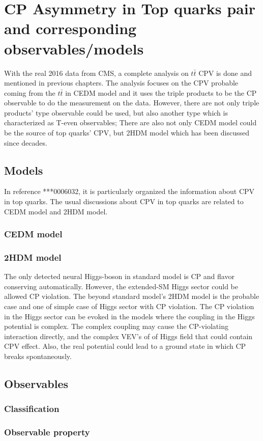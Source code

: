 

\section{CP Asymmetry in Top quarks pair and corresponding observables/models}
\label{sec:AcpModelObs}

	With the real 2016 data from CMS, a complete analysis on $t\bar{t}$ CPV is done and mentioned in previous chapters. The analysis focuses on the CPV probable coming from the $t\bar{t}$ in CEDM model and it uses the triple products to be the CP observable to do the measurement on the data. However, there are not only triple products' type observable could be used, but also another type which is characterized as T-even observables; There are also not only CEDM model could be the source of top quarks' CPV, but 2HDM model which has been discussed since decades. 

	\subsection{Models}
	\label{ssec:AcpModel}

		In reference ***0006032, it is particularly organized the information about CPV in top quarks. The usual discussions about CPV in top quarks are related to CEDM model and 2HDM model.

		\subsubsection{ CEDM model}
		\label{sssec:AcpModel_CEDM}

		\subsubsection{ 2HDM model}
		\label{sssec:AcpModel_2HDM}

			The only detected neural Higgs-boson in standard model is CP and flavor conserving automatically. However, the extended-SM Higgs sector could be allowed CP violation. The beyond standard model's 2HDM model is the probable case and one of simple case of Higgs sector with CP violation. The CP violation in the Higgs sector can be evoked in the models where the coupling in the Higgs potential is complex. The complex coupling may cause the CP-violating interaction directly, and the complex VEV's of of Higgs field that could contain CPV effect. Also, the real potential could lead to a ground state in which CP breaks spontaneously.

	\subsection{Observables}
	\label{ssec:AcpObs}

		\subsubsection{Classification}
		\label{sssec:AcpObs_class}

		\subsubsection{Observable property}
		\label{sssec:AcpObs_property}


\FloatBarrier
